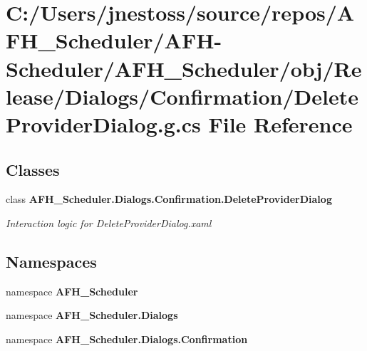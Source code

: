 \section{C\+:/\+Users/jnestoss/source/repos/\+A\+F\+H\+\_\+\+Scheduler/\+A\+F\+H-\/\+Scheduler/\+A\+F\+H\+\_\+\+Scheduler/obj/\+Release/\+Dialogs/\+Confirmation/\+Delete\+Provider\+Dialog.g.\+cs File Reference}
\label{_release_2_dialogs_2_confirmation_2_delete_provider_dialog_8g_8cs}
\subsection*{Classes}
\begin{DoxyCompactItemize}
\item 
class \textbf{ A\+F\+H\+\_\+\+Scheduler.\+Dialogs.\+Confirmation.\+Delete\+Provider\+Dialog}
\begin{DoxyCompactList}\small\item\em Interaction logic for Delete\+Provider\+Dialog.\+xaml \end{DoxyCompactList}\end{DoxyCompactItemize}
\subsection*{Namespaces}
\begin{DoxyCompactItemize}
\item 
namespace \textbf{ A\+F\+H\+\_\+\+Scheduler}
\item 
namespace \textbf{ A\+F\+H\+\_\+\+Scheduler.\+Dialogs}
\item 
namespace \textbf{ A\+F\+H\+\_\+\+Scheduler.\+Dialogs.\+Confirmation}
\end{DoxyCompactItemize}
